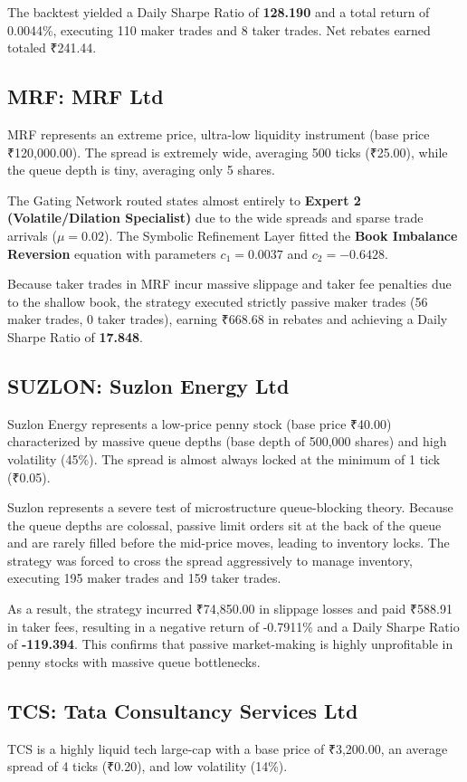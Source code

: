 \documentclass[11pt,a4paper]{article}
\begin{document}
The backtest yielded a Daily Sharpe Ratio of \textbf{128.190} and a total return of 0.0044\%, executing 110 maker trades and 8 taker trades. Net rebates earned totaled ₹241.44.

\subsection{MRF: MRF Ltd}
MRF represents an extreme price, ultra-low liquidity instrument (base price ₹120,000.00). The spread is extremely wide, averaging 500 ticks (₹25.00), while the queue depth is tiny, averaging only 5 shares.

The Gating Network routed states almost entirely to \textbf{Expert 2 (Volatile/Dilation Specialist)} due to the wide spreads and sparse trade arrivals ($\mu = 0.02$). The Symbolic Refinement Layer fitted the \textbf{Book Imbalance Reversion} equation with parameters $c_1 = 0.0037$ and $c_2 = -0.6428$.

Because taker trades in MRF incur massive slippage and taker fee penalties due to the shallow book, the strategy executed strictly passive maker trades (56 maker trades, 0 taker trades), earning ₹668.68 in rebates and achieving a Daily Sharpe Ratio of \textbf{17.848}.

\subsection{SUZLON: Suzlon Energy Ltd}
Suzlon Energy represents a low-price penny stock (base price ₹40.00) characterized by massive queue depths (base depth of 500,000 shares) and high volatility (45\%). The spread is almost always locked at the minimum of 1 tick (₹0.05).

Suzlon represents a severe test of microstructure queue-blocking theory. Because the queue depths are colossal, passive limit orders sit at the back of the queue and are rarely filled before the mid-price moves, leading to inventory locks. The strategy was forced to cross the spread aggressively to manage inventory, executing 195 maker trades and 159 taker trades.

As a result, the strategy incurred ₹74,850.00 in slippage losses and paid ₹588.91 in taker fees, resulting in a negative return of -0.7911\% and a Daily Sharpe Ratio of \textbf{-119.394}. This confirms that passive market-making is highly unprofitable in penny stocks with massive queue bottlenecks.

\subsection{TCS: Tata Consultancy Services Ltd}
TCS is a highly liquid tech large-cap with a base price of ₹3,200.00, an average spread of 4 ticks (₹0.20), and low volatility (14\%).
\end{document}
